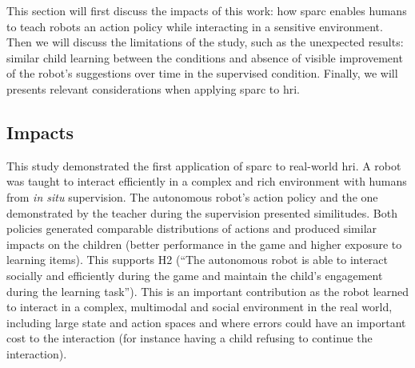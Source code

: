 This section will first discuss the impacts of this work: how \gls{sparc} enables humans to teach robots an action policy while interacting in a sensitive environment. Then we will discuss the limitations of the study, such as the unexpected results: similar child learning between the conditions and absence of visible improvement of the robot's suggestions over time in the supervised condition. Finally, we will presents relevant considerations when applying \gls{sparc} to \gls{hri}.

\subsection{Impacts} \label{sec:tutoring_opportunities}



This study demonstrated the first application of \gls{sparc} to real-world \gls{hri}. A robot was taught to interact efficiently in a complex and rich environment with humans from \textit{in situ} supervision. The autonomous robot's action policy and the one demonstrated by the teacher during the supervision presented similitudes. Both policies generated comparable distributions of actions and produced similar impacts on the children (better performance in the game and higher exposure to learning items). This supports H2 (``The autonomous robot is able to interact socially and efficiently during the game and maintain the child’s engagement during the learning task''). %
This is an important contribution as the robot learned to interact in a complex, multimodal and social environment in the real world, including large state and action spaces and where errors could have an important cost to the interaction (for instance having a child refusing to continue the interaction). %


